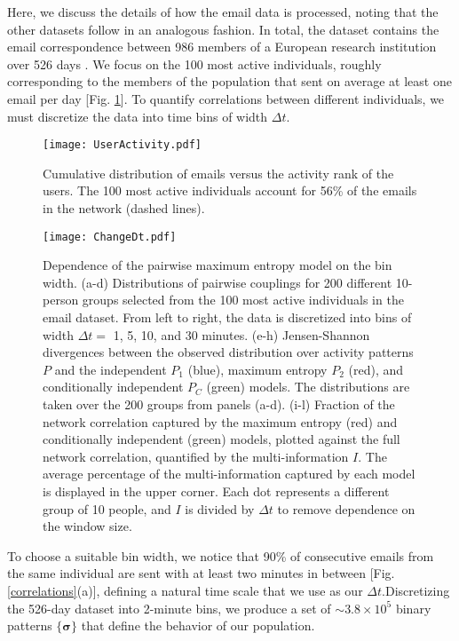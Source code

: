 \documentclass[aps,reprint,superscriptaddress,amsmath,amssymb,longbibliography]{revtex4-1}
\begin{document}
Here, we discuss the details of how the email data is processed, noting that the other datasets follow in an analogous fashion. In total, the dataset contains the email correspondence between 986 members of a European research institution over 526 days \cite{Paranjape-01}. We focus on the 100 most active individuals, roughly corresponding to the members of the population that sent on average at least one email per day [Fig. \ref{ParamChoices}]. To quantify correlations between different individuals, we must discretize the data into time bins of width $\Delta t$.
\begin{figure}[h]
\texttt{[image: UserActivity.pdf]}
\caption{\label{ParamChoices} Cumulative distribution of emails versus the activity rank of the users. The 100 most active individuals account for 56\% of the emails in the network (dashed lines).}
\end{figure}
\begin{figure*}
\texttt{[image: ChangeDt.pdf]}
\caption{\label{ChangeDt} Dependence of the pairwise maximum entropy model on the bin width. (a-d) Distributions of pairwise couplings for 200 different 10-person groups selected from the 100 most active individuals in the email dataset. From left to right, the data is discretized into bins of width $\Delta t = $ 1, 5, 10, and 30 minutes. (e-h) Jensen-Shannon divergences between the observed distribution over activity patterns $P$ and the independent $P_1$ (blue), maximum entropy $P_2$ (red), and conditionally independent $P_C$ (green) models. The distributions are taken over the 200 groups from panels (a-d). (i-l) Fraction of the network correlation captured by the maximum entropy (red) and conditionally independent (green) models, plotted against the full network correlation, quantified by the multi-information $I$. The average percentage of the multi-information captured by each model is displayed in the upper corner. Each dot represents a different group of 10 people, and $I$ is divided by $\Delta t$ to remove dependence on the window size.}
\end{figure*} 
To choose a suitable bin width, we notice that 90\% of consecutive emails from the same individual are sent with at least two minutes in between [Fig. \ref{correlations}(a)], defining a natural time scale that we use as our $\Delta t$.Discretizing the 526-day dataset into 2-minute bins, we produce a set of $\sim 3.8\times 10^5$ binary patterns $\{\bm{\sigma}\}$ that define the behavior of our population.
\end{document}
